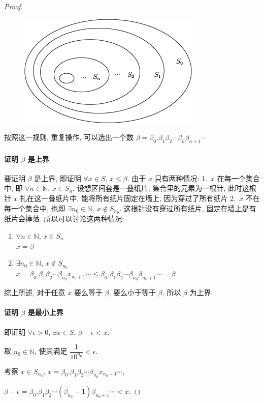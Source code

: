 \documentclass[UTF8]{ctexart}
\newcommand{\N}{\mathbb N}
\begin{document}
\begin{proof}
    \begin{figure}[H]
        \centering
        \includegraphics[width = 0.4\linewidth]{./images/nested.png}
    \end{figure}

    按照这一规则, 重复操作, 可以选出一个数 $ \beta = \beta_0. \beta_1 \beta_2 \cdots \beta_n \beta_{n + 1} \cdots $

    \paragraph{证明 $ \beta $ 是上界}
    要证明 $ \beta $ 是上界, 即证明 $ \forall x \in S $, $ x \leqslant \beta $. 由于 $ x $ 只有两种情况: 1.\, $ x $ 在每一个集合中, 即 $ \forall n \in \N $, $ x \in S_n $. 设想区间套是一叠纸片, 集合里的元素为一根针, 此时这根针 $ x $ 扎在这一叠纸片中, 能将所有纸片固定在墙上, 因为穿过了所有纸片  2.\, $ x $ 不在每一个集合中, 也即 $ \exists n_0 \in \N $, $ x \not\in S_{n_0} $. 这根针没有穿过所有纸片, 固定在墙上是有纸片会掉落. 所以可以讨论这两种情况:
    \begin{enumerate}
        \item $ \forall n \in \N $, $ x \in S_n $ \\
            $ x = \beta $
        \item $ \exists n_0 \in \N $, $ x \not\in S_{n_0} $ \\
            $ x = \beta_0.\beta_1 \beta_2 \cdots \beta_{n_0} x_{n_0 + 1} \cdots \leqslant \beta_0.\beta_1 \beta_2 \cdots \beta_{n_0} \beta_{n_0 + 1} \cdots = \beta $
    \end{enumerate}

    综上所述, 对于任意 $ x $ 要么等于 $ \beta $, 要么小于等于 $ \beta $, 所以 $ \beta $ 为上界.

    \paragraph{证明 $ \beta $ 是最小上界}
    即证明 $ \forall \epsilon > 0 $, $ \exists x \in S $, $ \beta - \epsilon < x $.

    取 $ n_0 \in \N $, 使其满足 $ \dfrac{1}{10^{n_0}} < \epsilon $. 

    考察 $ x \in S_{n_0} $, $ x = \beta_0.\beta_1 \beta_2 \cdots \beta_{n_0} x_{n_0 + 1} \cdots $, 
    
    $ \beta - \epsilon = \beta_0.\beta_1 \beta_2 \cdots (\beta_{n_0} - 1) \beta_{n_0 + 1} \cdots < x $.
\end{proof}
\end{document}
